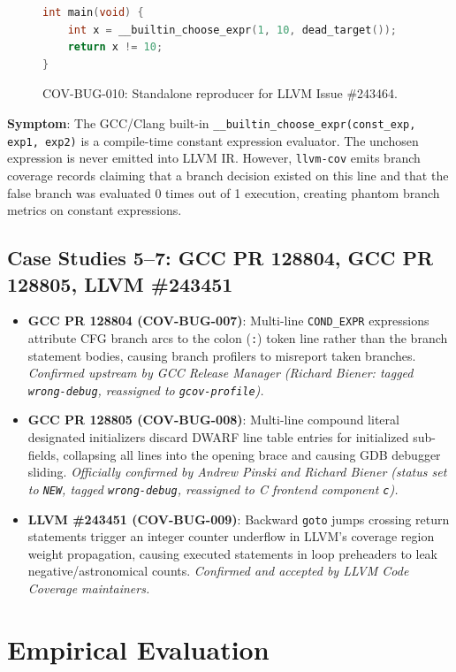 \documentclass[sigconf,review,anonymous=false]{acmart}
\theoremstyle{definition}
\begin{document}
\begin{figure}[h]
\begin{lstlisting}[language=C]
int main(void) {
    int x = __builtin_choose_expr(1, 10, dead_target());
    return x != 10;
}
\end{lstlisting}
\caption{COV-BUG-010: Standalone reproducer for LLVM Issue \#243464.}
\label{fig:repro_bug010}
\end{figure}

\textbf{Symptom}: The GCC/Clang built-in \texttt{\_\_builtin\_choose\_expr(const\_exp, exp1, exp2)} is a compile-time constant expression evaluator. The unchosen expression is never emitted into LLVM IR. However, \texttt{llvm-cov} emits branch coverage records claiming that a branch decision existed on this line and that the false branch was evaluated 0 times out of 1 execution, creating phantom branch metrics on constant expressions.

\subsection{Case Studies 5--7: GCC PR 128804, GCC PR 128805, LLVM \#243451}
\begin{itemize}
    \item \textbf{GCC PR 128804 (COV-BUG-007)}: Multi-line \texttt{COND\_EXPR} expressions attribute CFG branch arcs to the colon (\texttt{:}) token line rather than the branch statement bodies, causing branch profilers to misreport taken branches. \textit{Confirmed upstream by GCC Release Manager (Richard Biener: tagged \texttt{wrong-debug}, reassigned to \texttt{gcov-profile}).}
    \item \textbf{GCC PR 128805 (COV-BUG-008)}: Multi-line compound literal designated initializers discard DWARF line table entries for initialized sub-fields, collapsing all lines into the opening brace and causing GDB debugger sliding. \textit{Officially confirmed by Andrew Pinski and Richard Biener (status set to \texttt{NEW}, tagged \texttt{wrong-debug}, reassigned to C frontend component \texttt{c}).}
    \item \textbf{LLVM \#243451 (COV-BUG-009)}: Backward \texttt{goto} jumps crossing return statements trigger an integer counter underflow in LLVM's coverage region weight propagation, causing executed statements in loop preheaders to leak negative/astronomical counts. \textit{Confirmed and accepted by LLVM Code Coverage maintainers.}
\end{itemize}

\section{Empirical Evaluation}
\end{document}
